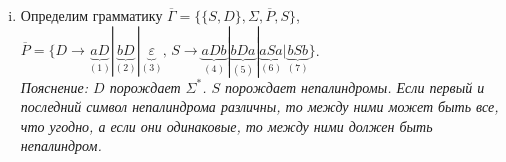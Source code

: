 \documentclass[a4paper]{article}
\begin{document}
\begin{enumerate}[i.]
\begin{enumerate}
\begin{enumerate}[0.]
\item $n\mod 2=1\Rightarrow w=x\sigma y,\, |x|=|y|,\,\sigma\in\Sigma$. $w=w^R\Rightarrow x\sigma y=y^R\sigma^Rx^R=y^R\sigma x^R$. Так как $|x|=|y|$, $y=x^R\Rightarrow\boxed{w=x\sigma x^R}$
\end{enumerate}
Значит, $L=\{xx^R,\,xax^R,\,xbx^R\big| x\in\Sigma^*\}$.
\\[5pt]
Построим вывод $S\Longrightarrow^*xSx^R$:\begin{enumerate}[a.]
\item Пусть $x=\varepsilon$. $S\overset{(1)}{\Longrightarrow}\varepsilon=\varepsilon\varepsilon^R=w\Rightarrow w\in L(\Gamma)\,\blacksquare$. 
\item Иначе $x=x_1...x_m,\,\forall i\in\overline{1,m}\hookrightarrow x_i\in\Sigma$. Рассмотрим символы $x_m,...,x_1$. Применим правило $(2)$, если $x_i=a$ и $(3)$ иначе. Примененное правило обозначим за $R(i)$ Получим $S\overset{(R(m))}{\Longrightarrow}x_mSx_m\Longrightarrow...\overset{(R(1))}{\Longrightarrow}x_1...x_mSx_m...x_1$.
\end{enumerate}
Теперь покажем, как получить $w$:\begin{enumerate}[1.]
\item $w=xx^R$. Было получено $S\Longrightarrow^*xSx^R$. Тогда $S\Longrightarrow^*xSx^R\overset{(1)}{\Longrightarrow}xx^R\,\blacksquare$
\item $w=xax^R$. Было получено $S\Longrightarrow^*xSx^R$. Тогда $S\Longrightarrow^*xSx^R\overset{(4)}{\Longrightarrow}xax^R\,\blacksquare$
\item $w=xbx^R$. Было получено $S\Longrightarrow^*xSx^R$. Тогда $S\Longrightarrow^*xSx^R\overset{(5)}{\Longrightarrow}xbx^R\,\blacksquare$
\end{enumerate}
Получаем $w\in L(\Gamma)$.\newline
$\boxed{\mbox{Ответ: }\ansbac.}$
\end{enumerate}
\item Определим грамматику $\overline{\Gamma}=\{\{S,D\},\Sigma,\overline{P},S\}$, $\overline{P}=\big\{D\longrightarrow \underbrace{aD}_{(1)}|\underbrace{bD}_{(2)}|\underbrace{\varepsilon}_{(3)},\,S\longrightarrow \underbrace{aDb}_{(4)}|\underbrace{bDa}_{(5)}|\underbrace{aSa}_{(6)}|\underbrace{bSb}_{(7)}\big\}$.
\\[5pt]
{\em Пояснение: $D$ порождает $\Sigma^*$. $S$ порождает непалиндромы. Если первый и последний символ непалиндрома различны, то между ними может быть все, что угодно, а если они одинаковые, то между ними должен быть непалиндром.}
\begin{enumerate}[1.]

\end{enumerate}
\end{enumerate}
\end{document}
